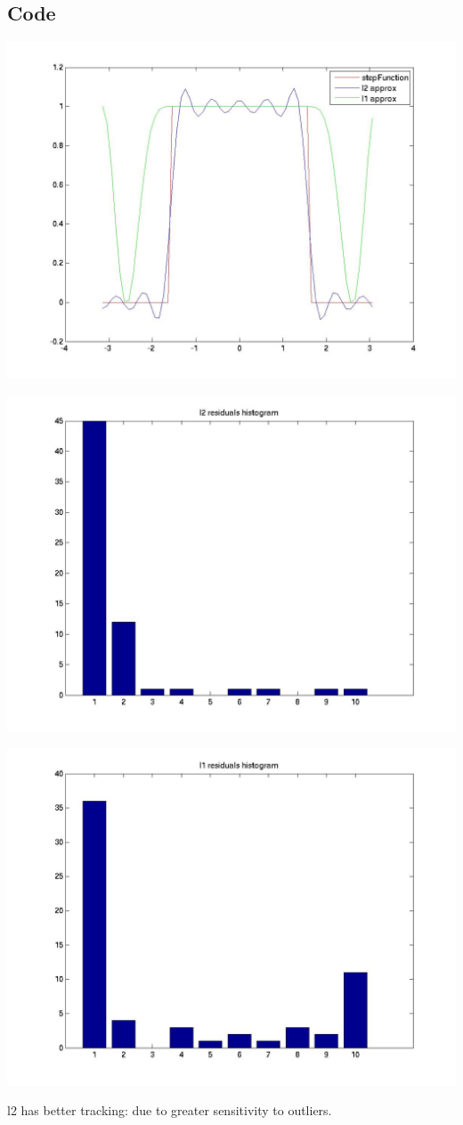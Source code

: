 \documentclass{article}
\begin{document}
\subsection{Code}


\includegraphics[scale=.2]{code/trigonometricApproximationExperiments.jpg}

\includegraphics[scale=.2]{code/trigonometricApproximationExperimentsResidualsL2.jpg}

\includegraphics[scale=.2]{code/trigonometricApproximationExperimentsResidualsL1.jpg}

l2 has better tracking: due to greater sensitivity to outliers.

% 
% 
\end{document}
